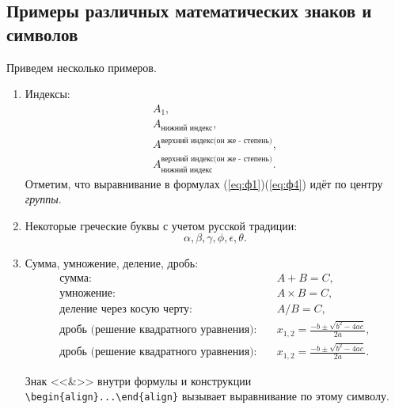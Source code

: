 \newpage
\subsection{Примеры различных математических знаков и символов}

Приведем несколько примеров.

\begin{enumerate}
\item Индексы:
{\zerodisplayskips
	\begin{align}
	A_1, \label{eq:ф1}\\
	A_{\text{нижний индекс}}, \label{eq:ф2}\\
	A^{\text{верхний индекс(он же - степень)}}, \label{eq:ф3}\\
	A_{\text{нижний индекс}}^{\text{верхний индекс(он же - степень)}}. \label{eq:ф4}
	\end{align}	
}%
Отметим, что выравнивание в формулах (\ref{eq:ф1})\ndash (\ref{eq:ф4}) идёт по центру \textit{группы}.
\item Некоторые греческие буквы с учетом русской традиции:	
{\zerodisplayskips
	\begin{equation}
	\alpha,\beta,\gamma,\phi,\epsilon,\theta. \label{eq:ф5}
	\end{equation}
}%
\item Сумма, умножение, деление, дробь:
{\zerodisplayskips
	\begin{align}
	\text{сумма:}\quad & A+B=C, \label{eq:ф6}\\
	\text{умножение:}\quad & A\times B=C, \label{eq:ф7}\\
	\text{деление через косую черту:}\quad & A/B=C, \label{eq:ф8}\\
	\text{дробь (решение квадратного уравнения):}\quad & x_{1,2}=\frac{-b\pm\sqrt{b^2-4ac}}{2a}, \label{eq:ф9}\\
	\text{дробь (решение квадратного уравнения):}\quad & x_{1,2}=\frac{-b\pm\sqrt{b^2-4ac}}{2a}. \label{eq:ф99}
	\end{align}
}%

Знак <<\&>> внутри формулы и конструкции \verb=\begin{align}...\end{align}= вызывает выравнивание по этому символу. 


\end{enumerate}
